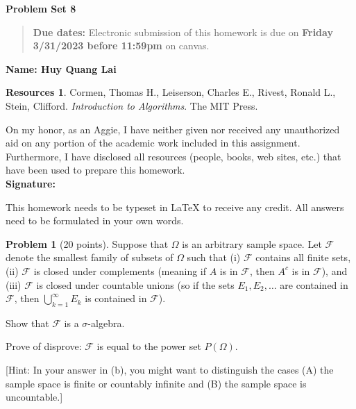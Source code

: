 \documentclass{article}
\theoremstyle{definition}
\newtheorem{problem}{Problem}
\newtheorem*{resources}{Resources}
\newcommand{\name}[1]{\noindent\textbf{Name: #1}}
\newcommand{\honor}{\noindent On my honor, as an Aggie, I have neither
  given nor received any unauthorized aid on any portion of the
  academic work included in this assignment. Furthermore, I have
  disclosed all resources (people, books, web sites, etc.) that have
  been used to prepare this homework. \\[1ex]
 \textbf{Signature:} \underline{\hspace*{5cm}} }
\newcommand{\problemset}[1]{\begin{center}\textbf{Problem Set
      #1}\end{center}}
\newcommand{\duedate}[2]{\begin{quote}\textbf{Due dates:} Electronic
    submission of this homework is due on \textbf{#1} on canvas.\end{quote} }
\begin{document}
\problemset{8}
\duedate{Friday 3/31/2023 before 11:59pm}{3/31/2023}
\name{ Huy Quang Lai}
\begin{resources} Cormen, Thomas H., Leiserson, Charles E., Rivest, Ronald L., Stein, Clifford. \textit{Introduction to Algorithms}. The MIT Press.
\end{resources}
\honor
\newpage

This homework needs to be typeset in LaTeX to receive any credit. All
answers need to be formulated in your own words. 

\begin{problem}[20 points] 
Suppose that $\Omega$ is an arbitrary sample space.
 Let $\mathcal{F}$ denote the smallest family of subsets of
$\Omega$ such that (i) $\mathcal{F}$ contains all finite sets, (ii)
$\mathcal{F}$ is closed under
complements (meaning if $A$ is in $\mathcal{F}$, then $A^c$ is in
$\mathcal{F}$), and (iii) $\mathcal{F}$ is closed under countable
unions (so if the sets $E_1, E_2,  \ldots$ are contained in
$\mathcal{F}$, then $\bigcup_{k=1}^\infty E_k$ is contained in
$\mathcal{F}$). 
\begin{compactenum}[(a)]
    \item Show that $\mathcal{F}$ is a $\sigma$-algebra. 
    \item Prove of disprove: $\mathcal{F}$ is equal to the power set $P(\Omega)$. 
\end{compactenum}
[Hint: In your answer in (b), you might want to distinguish the cases
(A) the sample space is finite or countably infinite and (B) the
sample space is uncountable.] 
\end{problem}
\end{document}
